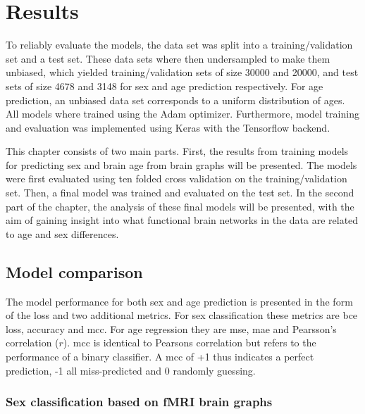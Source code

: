\chapter{Results}


To reliably evaluate the models, the data set was split into a training/validation set and a test set. These data sets where then undersampled to make them unbiased, which yielded training/validation sets of size 30000 and 20000, and test sets of size  4678 and 3148 for sex and age prediction respectively. For age prediction, an unbiased data set corresponds to a uniform distribution of ages. All models where trained using the Adam optimizer. Furthermore, model training and evaluation was implemented using Keras with the Tensorflow backend. 

This chapter consists of two main parts. First, the results from training models for predicting sex and brain age from brain graphs will be presented. The models were first evaluated using ten folded cross validation on the training/validation set. Then, a final model was trained and evaluated on the test set. In the second part of the chapter, the analysis of these final models will be presented, with the aim of gaining insight into what functional brain networks in the data are related to age and sex differences. 


\section{Model comparison}
\label{sec:model_pred}
The model performance for both sex and age prediction is presented in the form of the loss and two additional metrics. For sex classification these metrics are \acrfull{bce} loss, accuracy and \acrfull{mcc}. For age regression they are \acrfull{mse}, \acrfull{mae} and Pearsson's correlation ($r$). \acrshort{mcc} is identical to Pearsons correlation but refers to the performance of a binary classifier. A \acrshort{mcc} of +1 thus indicates a perfect prediction, -1 all miss-predicted and 0 randomly guessing.

\subsection{Sex classification based on fMRI brain graphs}

